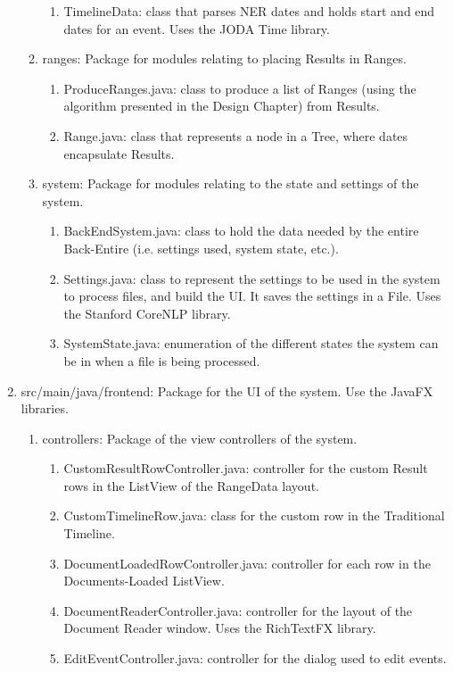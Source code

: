 \begin{enumerate}
\begin{enumerate}
\begin{enumerate}
				\item TimelineData: class that parses NER dates and holds start and end dates for an event. Uses the JODA Time library.
			\end{enumerate}
			\item ranges: Package for modules relating to placing Results in Ranges.
			\begin{enumerate}
				\item ProduceRanges.java: class to produce a list of Ranges (using the algorithm presented in the Design Chapter) from Results.
				\item Range.java: class that represents a node in a Tree, where dates encapsulate Results.
			\end{enumerate}
			\item system: Package for modules relating to the state and settings of the system.
			\begin{enumerate}
				\item BackEndSystem.java: class to hold the data needed by the entire Back-Entire (i.e. settings used, system state, etc.).
				\item Settings.java: class to represent the settings to be used in the system to process files, and build the UI. It saves the settings in a File. Uses the Stanford CoreNLP library.
				\item SystemState.java: enumeration of the different states the system can be in when a file is being processed.
			\end{enumerate}
		\end{enumerate}
	\item src/main/java/frontend: Package for the UI of the system. Use the JavaFX libraries.
	\begin{enumerate}
		\item controllers: Package of the view controllers of the system. 
		\begin{enumerate}
			\item CustomResultRowController.java: controller for the custom Result rows in the ListView of the RangeData layout.
			\item CustomTimelineRow.java: class for the custom row in the Traditional Timeline.
			\item DocumentLoadedRowController.java: controller for each row in the Documents-Loaded ListView.
			\item DocumentReaderController.java: controller for the layout of the Document Reader window. Uses the RichTextFX library.
			\item EditEventController.java: controller for the dialog used to edit events.

\end{enumerate}
\end{enumerate}
\end{enumerate}
